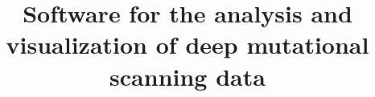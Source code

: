 \documentclass[twocolumn]{bmcart}%
\begin{document}
\begin{frontmatter}

\begin{fmbox}


\title{Software for the analysis and visualization of deep mutational scanning data}


\author[
   addressref={aff1},                   %
   corref={aff1},                       %
   email={jbloom@fredhutch.org}   %
]{ }



\address[id=aff1]{%
  , %
  ,                     %
  ,                              %
}




\end{fmbox}
\end{frontmatter}
\end{document}
